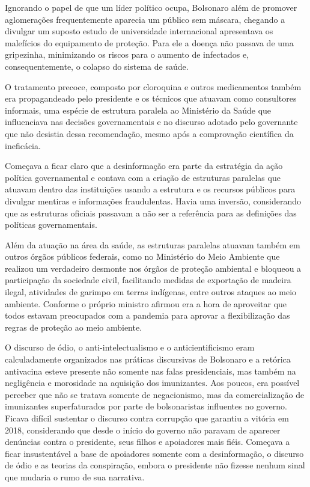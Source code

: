 Ignorando o papel de que um líder político ocupa, Bolsonaro além de
promover aglomerações frequentemente aparecia um público sem máscara,
chegando a divulgar um suposto estudo de universidade internacional
apresentava os malefícios do equipamento de proteção. Para ele a doença
não passava de uma gripezinha, minimizando os riscos para o aumento de
infectados e, consequentemente, o colapso do sistema de saúde.

O tratamento precoce, composto por cloroquina e outros medicamentos
também era propagandeado pelo presidente e os técnicos que atuavam como
consultores informais, uma espécie de estrutura paralela ao Ministério
da Saúde que influenciava nas decisões governamentais e no discurso
adotado pelo governante que não desistia dessa recomendação, mesmo após
a comprovação científica da ineficácia.

Começava a ficar claro que a desinformação era parte da estratégia da
ação política governamental e contava com a criação de estruturas
paralelas que atuavam dentro das instituições usando a estrutura e os
recursos públicos para divulgar mentiras e informações fraudulentas.
Havia uma inversão, considerando que as estruturas oficiais passavam a
não ser a referência para as definições das políticas governamentais.

Além da atuação na área da saúde, as estruturas paralelas atuavam também
em outros órgãos públicos federais, como no Ministério do Meio Ambiente
que realizou um verdadeiro desmonte nos órgãos de proteção ambiental e
bloqueou a participação da sociedade civil, facilitando medidas de
exportação de madeira ilegal, atividades de garimpo em terras indígenas,
entre outros ataques ao meio ambiente. Conforme o próprio ministro
afirmou era a hora de aproveitar que todos estavam preocupados com a
pandemia para aprovar a flexibilização das regras de proteção ao meio
ambiente.

O discurso de ódio, o anti-intelectualismo e o anticientificismo eram
calculadamente organizados nas práticas discursivas de Bolsonaro e a
retórica antivacina esteve presente não somente nas falas presidenciais,
mas também na negligência e morosidade na aquisição dos imunizantes. Aos
poucos, era possível perceber que não se tratava somente de
negacionismo, mas da comercialização de imunizantes superfaturados por
parte de bolsonaristas influentes no governo. Ficava difícil sustentar o
discurso contra corrupção que garantiu a vitória em 2018, considerando
que desde o início do governo não paravam de aparecer denúncias contra o
presidente, seus filhos e apoiadores mais fiéis. Começava a ficar
insustentável a base de apoiadores somente com a desinformação, o
discurso de ódio e as teorias da conspiração, embora o presidente não
fizesse nenhum sinal que mudaria o rumo de sua narrativa.

